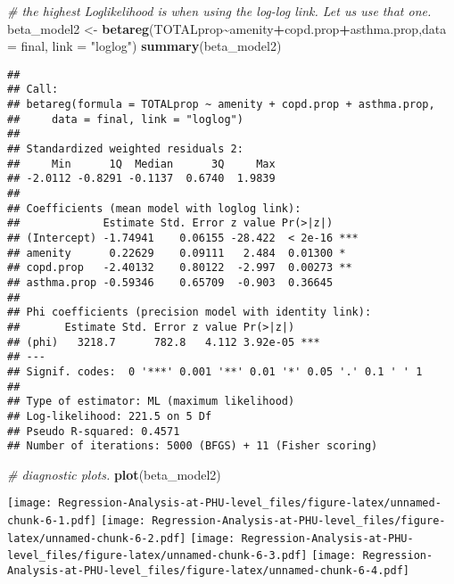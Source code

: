 \documentclass[]{article}
\newenvironment{Shaded}{\begin{snugshade}}{\end{snugshade}}
\newcommand{\CommentTok}[1]{\textcolor[rgb]{0.56,0.35,0.01}{\textit{#1}}}
\newcommand{\DataTypeTok}[1]{\textcolor[rgb]{0.13,0.29,0.53}{#1}}
\newcommand{\KeywordTok}[1]{\textcolor[rgb]{0.13,0.29,0.53}{\textbf{#1}}}
\newcommand{\NormalTok}[1]{#1}
\newcommand{\OperatorTok}[1]{\textcolor[rgb]{0.81,0.36,0.00}{\textbf{#1}}}
\newcommand{\StringTok}[1]{\textcolor[rgb]{0.31,0.60,0.02}{#1}}
\begin{document}
\begin{Shaded}
\begin{Highlighting}[]
\CommentTok{\# the highest Loglikelihood is when using the log{-}log link. Let us use that one.}
\NormalTok{beta\_model2 \textless{}{-}}\StringTok{ }\KeywordTok{betareg}\NormalTok{(TOTALprop}\OperatorTok{\textasciitilde{}}\NormalTok{amenity}\OperatorTok{+}\NormalTok{copd.prop}\OperatorTok{+}\NormalTok{asthma.prop,}\DataTypeTok{data =}\NormalTok{ final, }\DataTypeTok{link =} \StringTok{"loglog"}\NormalTok{)}
\KeywordTok{summary}\NormalTok{(beta\_model2)}
\end{Highlighting}
\end{Shaded}

\begin{verbatim}
## 
## Call:
## betareg(formula = TOTALprop ~ amenity + copd.prop + asthma.prop, 
##     data = final, link = "loglog")
## 
## Standardized weighted residuals 2:
##     Min      1Q  Median      3Q     Max 
## -2.0112 -0.8291 -0.1137  0.6740  1.9839 
## 
## Coefficients (mean model with loglog link):
##             Estimate Std. Error z value Pr(>|z|)    
## (Intercept) -1.74941    0.06155 -28.422  < 2e-16 ***
## amenity      0.22629    0.09111   2.484  0.01300 *  
## copd.prop   -2.40132    0.80122  -2.997  0.00273 ** 
## asthma.prop -0.59346    0.65709  -0.903  0.36645    
## 
## Phi coefficients (precision model with identity link):
##       Estimate Std. Error z value Pr(>|z|)    
## (phi)   3218.7      782.8   4.112 3.92e-05 ***
## ---
## Signif. codes:  0 '***' 0.001 '**' 0.01 '*' 0.05 '.' 0.1 ' ' 1 
## 
## Type of estimator: ML (maximum likelihood)
## Log-likelihood: 221.5 on 5 Df
## Pseudo R-squared: 0.4571
## Number of iterations: 5000 (BFGS) + 11 (Fisher scoring)
\end{verbatim}

\begin{Shaded}
\begin{Highlighting}[]
\CommentTok{\# diagnostic plots.}
\KeywordTok{plot}\NormalTok{(beta\_model2)}
\end{Highlighting}
\end{Shaded}

\texttt{[image: Regression-Analysis-at-PHU-level\_files/figure-latex/unnamed-chunk-6-1.pdf]}
\texttt{[image: Regression-Analysis-at-PHU-level\_files/figure-latex/unnamed-chunk-6-2.pdf]}
\texttt{[image: Regression-Analysis-at-PHU-level\_files/figure-latex/unnamed-chunk-6-3.pdf]}
\texttt{[image: Regression-Analysis-at-PHU-level\_files/figure-latex/unnamed-chunk-6-4.pdf]}
\end{document}
